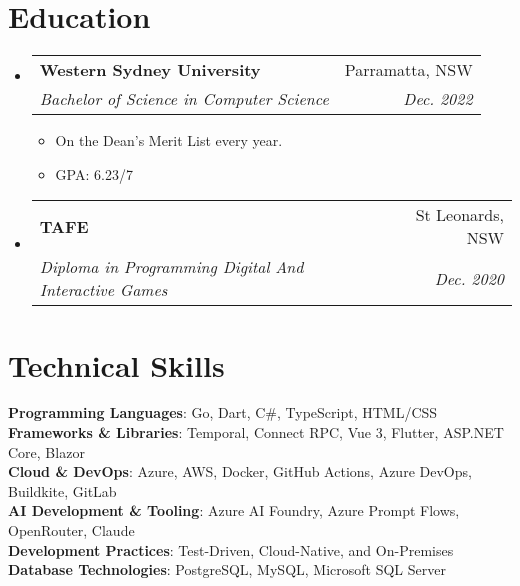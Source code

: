 \documentclass[a4paper,11pt]{article}
\makeatletter
\newcommand{\resumeItem}[1]{
  \item\small{
    {#1 \vspace{-2pt}}
  }
}
\newcommand{\resumeSubheading}[4]{
  \vspace{-2pt}\item
    \begin{tabular*}{0.97\textwidth}[t]{l@{\extracolsep{\fill}}r}
      \textbf{#1} & #2 \\
      \textit{\small#3} & \textit{\small #4} \\
    \end{tabular*}\vspace{-7pt}
}
\newcommand{\resumeSubHeadingListStart}{\begin{itemize}[leftmargin=0.15in, label={}]}
\newcommand{\resumeSubHeadingListEnd}{\end{itemize}}
\newcommand{\resumeItemListStart}{\begin{itemize}}
\newcommand{\resumeItemListEnd}{\end{itemize}\vspace{-5pt}}
\makeatother
\begin{document}
\section{Education}
  \resumeSubHeadingListStart
    \resumeSubheading
      {Western Sydney University}{Parramatta, NSW}
      {Bachelor of Science in Computer Science}{Dec. 2022}
      \resumeItemListStart
        \resumeItem{On the Dean's Merit List every year.}
        \resumeItem{GPA: 6.23/7}
      \resumeItemListEnd
      
    \resumeSubheading
      {TAFE}{St Leonards, NSW}
      {Diploma in Programming Digital And Interactive Games}{Dec. 2020}

  \resumeSubHeadingListEnd

\section{Technical Skills}
 \begin{itemize}[leftmargin=0.15in, label={}]
    \small{\item{
     \textbf{Programming Languages}{: Go, Dart, C\#, TypeScript, HTML/CSS} \\
     \textbf{Frameworks \& Libraries}{: Temporal, Connect RPC, Vue 3, Flutter, ASP.NET Core, Blazor} \\
     \textbf{Cloud \& DevOps}{: Azure, AWS, Docker, GitHub Actions, Azure DevOps, Buildkite, GitLab} \\
     \textbf{AI Development \& Tooling}{: Azure AI Foundry, Azure Prompt Flows, OpenRouter, Claude} \\
     \textbf{Development Practices}{: Test-Driven, Cloud-Native, and On-Premises} \\
     \textbf{Database Technologies}{: PostgreSQL, MySQL, Microsoft SQL Server} \\
    }}
 \end{itemize}
\end{document}
